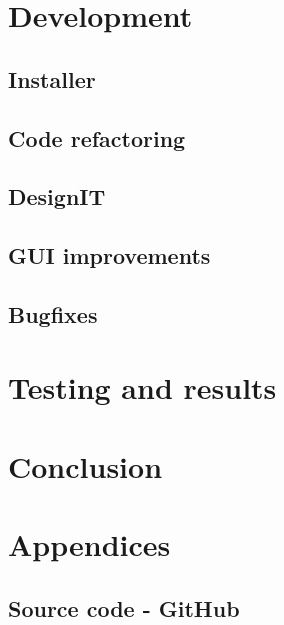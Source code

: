\documentclass[a4paper, 11pt, article]{report}
\begin{document}
\chapter{Development}

\section{Installer}

\section{Code refactoring}

\section{DesignIT}

\section{GUI improvements}

\section{Bugfixes}


\chapter{Testing and results}


\chapter{Conclusion}


\chapter{Appendices}

\section{Source code - GitHub}
\end{document}
